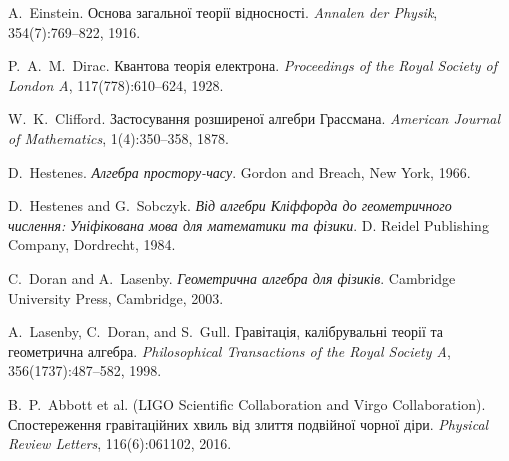 \documentclass[11pt,a4paper]{article}
\numberwithin{equation}{section}
\theoremstyle{plain}
\theoremstyle{definition}
\theoremstyle{remark}
\begin{document}
\begin{thebibliography}{9}

A.~Einstein.
\newblock Основа загальної теорії відносності.
\newblock \emph{Annalen der Physik}, 354(7):769--822, 1916.

P.~A.~M.~Dirac.
\newblock Квантова теорія електрона.
\newblock \emph{Proceedings of the Royal Society of London A}, 117(778):610--624, 1928.

W.~K.~Clifford.
\newblock Застосування розширеної алгебри Грассмана.
\newblock \emph{American Journal of Mathematics}, 1(4):350--358, 1878.

D.~Hestenes.
\newblock \emph{Алгебра простору-часу}.
\newblock Gordon and Breach, New York, 1966.

D.~Hestenes and G.~Sobczyk.
\newblock \emph{Від алгебри Кліффорда до геометричного числення: Уніфікована мова для математики та фізики}.
\newblock D. Reidel Publishing Company, Dordrecht, 1984.

C.~Doran and A.~Lasenby.
\newblock \emph{Геометрична алгебра для фізиків}.
\newblock Cambridge University Press, Cambridge, 2003.

A.~Lasenby, C.~Doran, and S.~Gull.
\newblock Гравітація, калібрувальні теорії та геометрична алгебра.
\newblock \emph{Philosophical Transactions of the Royal Society A}, 356(1737):487--582, 1998.

B.~P.~Abbott et al. (LIGO Scientific Collaboration and Virgo Collaboration).
\newblock Спостереження гравітаційних хвиль від злиття подвійної чорної діри.
\newblock \emph{Physical Review Letters}, 116(6):061102, 2016.

\end{thebibliography}
\end{document}
